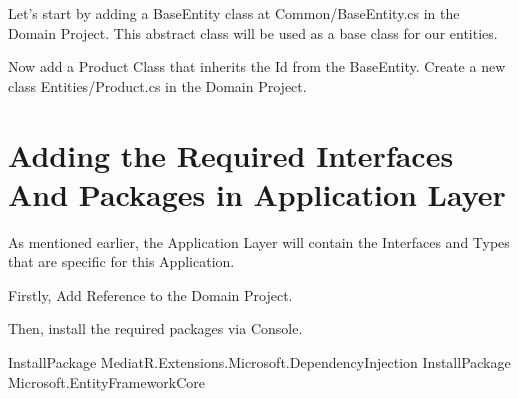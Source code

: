 \documentclass[letterpaper,10pt,english]{sphinxmanual}
\begin{document}
Let’s start by adding a BaseEntity class at Common/BaseEntity.cs in the Domain Project. This abstract class will be used as a base class for our entities.

\begin{sphinxVerbatim}[commandchars=\\\{\}]
   
          
\end{sphinxVerbatim}

Now add a Product Class that inherits the Id from the BaseEntity. Create a new class Entities/Product.cs in the Domain Project.

\begin{sphinxVerbatim}[commandchars=\\\{\}]
    
          
          
          
          
\end{sphinxVerbatim}


\section{Adding the Required Interfaces And Packages in Application Layer}
\label{\detokenize{OnionArchitecture/details:adding-the-required-interfaces-and-packages-in-application-layer}}
As mentioned earlier, the Application Layer will contain the Interfaces and Types that are specific for this Application.

Firstly, Add Reference to the Domain Project.

Then, install the required packages via Console.

\begin{sphinxVerbatim}[commandchars=\\\{\}]
Install\PYGZhy{}Package MediatR.Extensions.Microsoft.DependencyInjection
Install\PYGZhy{}Package Microsoft.EntityFrameworkCore
\end{sphinxVerbatim}
\end{document}
